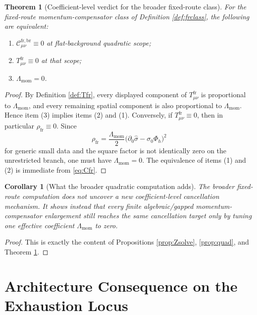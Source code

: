 \documentclass[11pt]{article}
\newtheorem{corollary}{Corollary}
\newtheorem{theorem}{Theorem}
\begin{document}
\begin{theorem}[Coefficient-level verdict for the broader fixed-route class]
\label{thm:coeff}
For the fixed-route momentum-compensator class of Definition \ref{def:frclass}, the following are equivalent:
\begin{enumerate}
    \item \(\mathcal C_{\mu\nu}^{\mathrm{fr,br}}\equiv 0\) at flat-background quadratic scope;
    \item \(T_{\mu\nu}^{\mathrm{fr}}\equiv 0\) at that scope;
    \item \(\Lambda_{\mathrm{mom}}=0\).
\end{enumerate}
\end{theorem}

\begin{proof}
By Definition \ref{def:Tfr}, every displayed component of \(T_{\mu\nu}^{\mathrm{fr}}\) is proportional to \(\Lambda_{\mathrm{mom}}\), and every remaining spatial component is also proportional to \(\Lambda_{\mathrm{mom}}\). Hence item (3) implies items (2) and (1). Conversely, if \(T_{\mu\nu}^{\mathrm{fr}}\equiv 0\), then in particular \(\rho_{\mathrm{fr}}\equiv 0\). Since
\[
\rho_{\mathrm{fr}}
=
\frac{\Lambda_{\mathrm{mom}}}{2}
\bigl(\partial_0\hat\sigma-\sigma_0\Phi_h\bigr)^2
\]
for generic small data and the square factor is not identically zero on the unrestricted branch, one must have \(\Lambda_{\mathrm{mom}}=0\). The equivalence of items (1) and (2) is immediate from \eqref{eq:Cfr}.
\end{proof}

\begin{corollary}[What the broader quadratic computation adds]
\label{cor:adds}
The broader fixed-route computation does \emph{not} uncover a new coefficient-level cancellation mechanism. It shows instead that every finite algebraic/gapped momentum-compensator enlargement still reaches the same cancellation target only by tuning one effective coefficient \(\Lambda_{\mathrm{mom}}\) to zero.
\end{corollary}

\begin{proof}
This is exactly the content of Propositions \ref{prop:Zsolve}, \ref{prop:quad}, and Theorem \ref{thm:coeff}.
\end{proof}

\section{Architecture Consequence on the Exhaustion Locus}
\end{document}
